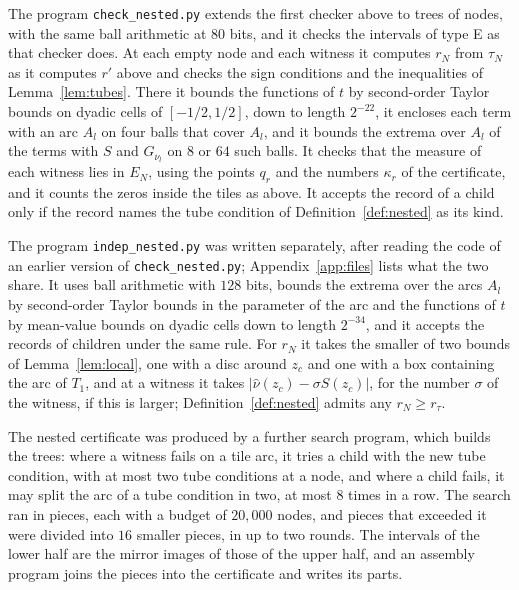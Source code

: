 \documentclass[11pt]{amsart}
\theoremstyle{definition}
\theoremstyle{remark}
\numberwithin{equation}{section}
\begin{document}
The program \texttt{check\_nested.py} extends the first checker above to trees of nodes, with the same ball arithmetic at $80$ bits, and it checks the intervals of type E as that checker does. At each empty node and each witness it computes $r_N$ from $\tau_N$ as it computes $r'$ above and checks the sign conditions and the inequalities of Lemma~\ref{lem:tubes}. There it bounds the functions of $t$ by second-order Taylor bounds on dyadic cells of $[-1/2,1/2]$, down to length $2^{-22}$, it encloses each term with an arc $A_l$ on four balls that cover $A_l$, and it bounds the extrema over $A_l$ of the terms with $S$ and $G_{\nu_l}$ on $8$ or $64$ such balls. It checks that the measure of each witness lies in $E_N$, using the points $q_r$ and the numbers $\kappa_r$ of the certificate, and it counts the zeros inside the tiles as above. It accepts the record of a child only if the record names the tube condition of Definition~\ref{def:nested} as its kind.

The program \texttt{indep\_nested.py} was written separately, after reading the code of an earlier version of \texttt{check\_nested.py}; Appendix~\ref{app:files} lists what the two share. It uses ball arithmetic with $128$ bits, bounds the extrema over the arcs $A_l$ by second-order Taylor bounds in the parameter of the arc and the functions of $t$ by mean-value bounds on dyadic cells down to length $2^{-34}$, and it accepts the records of children under the same rule. For $r_N$ it takes the smaller of two bounds of Lemma~\ref{lem:local}, one with a disc around $z_c$ and one with a box containing the arc of $T_1$, and at a witness it takes $|\hat\nu(z_c)-\sigma S(z_c)|$, for the number $\sigma$ of the witness, if this is larger; Definition~\ref{def:nested} admits any $r_N\ge r_\tau$.

The nested certificate was produced by a further search program, which builds the trees: where a witness fails on a tile arc, it tries a child with the new tube condition, with at most two tube conditions at a node, and where a child fails, it may split the arc of a tube condition in two, at most $8$ times in a row. The search ran in pieces, each with a budget of $20{,}000$ nodes, and pieces that exceeded it were divided into $16$ smaller pieces, in up to two rounds. The intervals of the lower half are the mirror images of those of the upper half, and an assembly program joins the pieces into the certificate and writes its parts.
\end{document}
